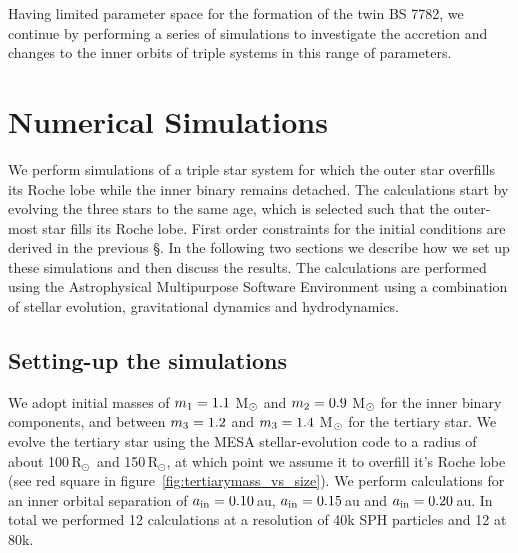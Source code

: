 \documentclass[twocolumn]{aastex62}
\newcommand{\RSun}{\mbox{R$_\odot$}}
\begin{document}
Having limited parameter space for the formation of the twin BS 7782, we continue by performing a series of simulations to
investigate the accretion and changes to the inner orbits of triple
systems in this range of parameters.

\section{Numerical Simulations} \label{sims}

We perform simulations of a triple star system for which the outer
star overfills its Roche lobe while the inner binary remains
detached. The calculations start by evolving the three stars to the
same age, which is selected such that the outer-most star fills its
Roche lobe.  First order constraints for the initial conditions are
derived in the previous \S. In the following two sections we describe
how we set up these simulations and then discuss the results. The
calculations are performed using the Astrophysical Multipurpose
Software Environment using a combination of stellar evolution,
gravitational dynamics and hydrodynamics.

\subsection{Setting-up the simulations}

We adopt initial masses of $m_{\rm 1} = 1.1$ M$_{\rm \odot}$ and
$m_{\rm 2} = 0.9$ M$_{\rm \odot}$ for the inner binary components, and
between $m_{\rm 3} = 1.2$ and $m_{\rm 3} = 1.4$ M$_{\rm \odot}$ for
the tertiary star.  We evolve the tertiary star using the MESA
stellar-evolution code \cite{2011ApJS..192....3P} to a radius of about
100\,\RSun\, and 150\,\RSun, at which point we assume it to overfill
it's Roche lobe (see red square in
figure~\ref{fig:tertiarymass_vs_size}).  We perform calculations for an
inner orbital separation of $a_{\rm in} = 0.10$\,au, $a_{\rm in} =
0.15$\,au and $a_{\rm in} = 0.20$\,au.  In total we performed 12
calculations at a resolution of 40k SPH particles and 12 at 80k.
\end{document}
